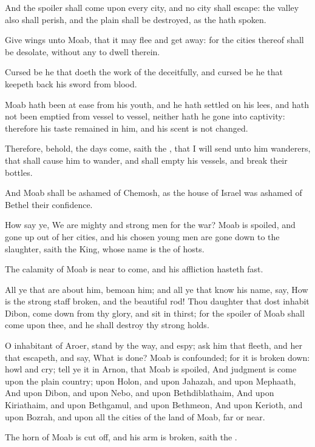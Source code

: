 \verse And the spoiler shall come upon every city, and no city shall escape: the valley also shall perish, and the plain shall be destroyed, as the \LORD hath spoken.

\verse Give wings unto Moab, that it may flee and get away: for the cities thereof shall be desolate, without any to dwell therein.

\verse Cursed be he that doeth the work of the \LORD deceitfully, and cursed be he that keepeth back his sword from blood.

\verse Moab hath been at ease from his youth, and he hath settled on his lees, and hath not been emptied from vessel to vessel, neither hath he gone into captivity: therefore his taste remained in him, and his scent is not changed.

\verse Therefore, behold, the days come, saith the \LORD, that I will send unto him wanderers, that shall cause him to wander, and shall empty his vessels, and break their bottles.

\verse And Moab shall be ashamed of Chemosh, as the house of Israel was ashamed of Bethel their confidence.

\verse How say ye, We are mighty and strong men for the war?  \verse Moab is spoiled, and gone up out of her cities, and his chosen young men are gone down to the slaughter, saith the King, whose name is the \LORD of hosts.

\verse The calamity of Moab is near to come, and his affliction hasteth fast.

\verse All ye that are about him, bemoan him; and all ye that know his name, say, How is the strong staff broken, and the beautiful rod!  \verse Thou daughter that dost inhabit Dibon, come down from thy glory, and sit in thirst; for the spoiler of Moab shall come upon thee, and he shall destroy thy strong holds.

\verse O inhabitant of Aroer, stand by the way, and espy; ask him that fleeth, and her that escapeth, and say, What is done?  \verse Moab is confounded; for it is broken down: howl and cry; tell ye it in Arnon, that Moab is spoiled, \verse And judgment is come upon the plain country; upon Holon, and upon Jahazah, and upon Mephaath, \verse And upon Dibon, and upon Nebo, and upon Bethdiblathaim, \verse And upon Kiriathaim, and upon Bethgamul, and upon Bethmeon, \verse And upon Kerioth, and upon Bozrah, and upon all the cities of the land of Moab, far or near.

\verse The horn of Moab is cut off, and his arm is broken, saith the \LORD.


